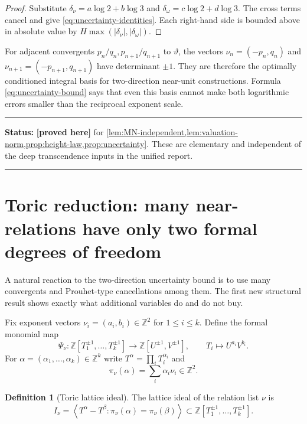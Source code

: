 \documentclass[11pt,oneside]{article}
\theoremstyle{definition}
\newtheorem{definition}[theorem]{Definition}
\theoremstyle{remark}
\newcommand{\Z}{\mathbb Z}
\newcommand{\thetaAE}{\vartheta}
\newcommand{\statusproved}{\textcolor{provedgreen}{\textbf{[proved here]}}}
\newenvironment{statusbox}[1]
{\begin{center}\begin{minipage}{0.94\textwidth}\raggedright\hrule\vspace{0.45em}
\textbf{Status:} #1\par\vspace{0.35em}}
{\vspace{0.35em}\hrule\end{minipage}\end{center}}
\begin{document}
\begin{proof}
Substitute $\delta_\nu=a\log2+b\log3$ and
$\delta_\omega=c\log2+d\log3$.  The cross terms cancel and give
\eqref{eq:uncertainty-identities}.  Each right-hand side is bounded above in absolute value
by $H\max(|\delta_\nu|,|\delta_\omega|)$.
\end{proof}

For adjacent convergents $p_n/q_n,p_{n+1}/q_{n+1}$ to $\thetaAE$, the vectors
$\nu_n=(-p_n,q_n)$ and $\nu_{n+1}=(-p_{n+1},q_{n+1})$ have determinant $\pm1$.
They are therefore the optimally conditioned integral basis for two-direction near-unit
constructions.  Formula \eqref{eq:uncertainty-bound} says that even this basis cannot make
both logarithmic errors smaller than the reciprocal exponent scale.

\begin{statusbox}{\statusproved{} for \cref{lem:MN-independent,lem:valuation-norm,prop:height-law,prop:uncertainty}.
These are elementary and independent of the deep transcendence inputs in the unified report.}
\end{statusbox}

\section{Toric reduction: many near-relations have only two formal degrees of freedom}
\label{sec:toric}

A natural reaction to the two-direction uncertainty bound is to use many convergents and
Prouhet-type cancellations among them.  The first new structural result shows exactly what
additional variables do and do not buy.

Fix exponent vectors $\nu_i=(a_i,b_i)\in\Z^2$ for $1\le i\le k$.  Define the formal monomial
map
\begin{equation}
 \Psi_\nu:\Z[T_1^{\pm1},\ldots,T_k^{\pm1}]
 \longrightarrow \Z[U^{\pm1},V^{\pm1}],
 \qquad
 T_i\longmapsto U^{a_i}V^{b_i}.
 \label{eq:monomial-map}
\end{equation}
For $\alpha=(\alpha_1,\ldots,\alpha_k)\in\Z^k$ write
$T^\alpha=\prod_iT_i^{\alpha_i}$ and
\[
 \pi_\nu(\alpha)=\sum_i\alpha_i\nu_i\in\Z^2.
\]

\begin{definition}[Toric lattice ideal]
\label{def:toric-ideal}
The lattice ideal of the relation list $\nu$ is
\begin{equation}
 I_\nu=
 \left\langle T^\alpha-T^\beta:
 \pi_\nu(\alpha)=\pi_\nu(\beta)\right\rangle
 \subset\Z[T_1^{\pm1},\ldots,T_k^{\pm1}].
 \label{eq:toric-ideal}
\end{equation}
\end{definition}
\end{document}
